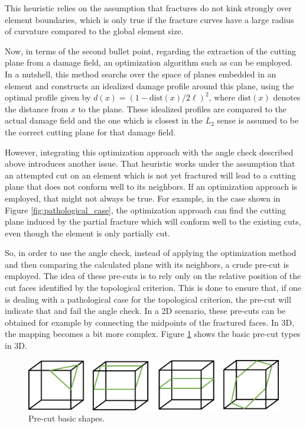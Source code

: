 This heuristic relies on the assumption that fractures do not kink strongly over element boundaries, which is only true if the fracture curves have a large radius of curvature compared to the global element size. 

Now, in terms of the second bullet point, regarding the extraction of the cutting plane from a damage field, an optimization algorithm such as \cite{geelen2018optimization} can be employed. In a nutshell, this method searchs over the space of planes embedded in an element and constructs an idealized damage profile around this plane, using the optimal profile given by $d(x) = (1-\text{dist}(x)/2\ell)^2$, where $\text{dist}(x)$ denotes the distance from $x$ to the plane. These idealized profiles are compared to the actual damage field and the one which is closest in the $L_2$ sense is assumed to be the correct cutting plane for that damage field.

However, integrating this optimization approach with the angle check described above introduces another issue. That heuristic works under the assumption that an attempted cut on an element which is not yet fractured will lead to a cutting plane that does not conform well to its neighbors. If an optimization approach is employed, that might not always be true. For example, in the case shown in Figure \ref{fig:pathological_case}, the optimization approach can find the cutting plane induced by the partial fracture which will conform well to the existing cuts, even though the element is only partially cut.

So, in order to use the angle check, instead of applying the optimization method and then comparing the calculated plane with its neighbors, a crude pre-cut is employed. The idea of these pre-cuts is to rely only on the relative position of the cut faces identified by the topological criterion. This is done to ensure that, if one is dealing with a pathological case for the topological criterion, the pre-cut will indicate that and fail the angle check. In a 2D scenario, these pre-cuts can be obtained for example by connecting the midpoints of the fractured faces. In 3D, the mapping becomes a bit more complex. Figure \ref{fig:pre_cuts} shows the basic pre-cut types in 3D. 

\begin{figure}[h]
    \centering
    \includegraphics[width=0.8\linewidth]{Chapter4/figures/nonplanar/pre_cuts.png}
    \caption{Pre-cut basic shapes.}
    \label{fig:pre_cuts}
\end{figure}


